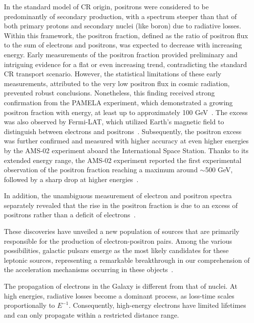 In the standard model of CR origin, positrons were considered to be predominantly of secondary production, with a spectrum steeper than that of both primary protons and secondary nuclei (like boron) due to radiative losses. Within this framework, the positron fraction, defined as the ratio of positron flux to the sum of electrons and positrons, was expected to decrease with increasing energy. Early measurements of the positron fraction provided preliminary and intriguing evidence for a flat or even increasing trend, contradicting the standard CR transport scenario. However, the statistical limitations of these early measurements, attributed to the very low positron flux in cosmic radiation, prevented robust conclusions. Nonetheless, this finding received strong confirmation from the PAMELA experiment, which demonstrated a growing positron fraction with energy, at least up to approximately 100 GeV~\cite{PAMELA.2009.posfraction}. The excess was also observed by Fermi-LAT, which utilized Earth's magnetic field to distinguish between electrons and positrons~\cite{FERMI.2012.posfraction}. 
%
Subsequently, the positron excess was further confirmed and measured with higher accuracy at even higher energies by the AMS-02 experiment aboard the International Space Station. Thanks to its extended energy range, the AMS-02 experiment reported the first experimental observation of the positron fraction reaching a maximum around $\sim$500 GeV, followed by a sharp drop at higher energies~\cite{AMS02.2013.posfraction}.

In addition, the unambiguous measurement of electron and positron spectra separately revealed that the rise in the positron fraction is due to an excess of positrons rather than a deficit of electrons~\cite{AMS02.2019.electrons}.

These discoveries have unveiled a new population of sources that are primarily responsible for the production of electron-positron pairs. Among the various possibilities, galactic pulsars emerge as the most likely candidates for these leptonic sources, representing a remarkable breakthrough in our comprehension of the acceleration mechanisms occurring in these objects~\cite{Harding1987icrc,Aharonian1995aa,Grasso2009aph,Hooper2009jcap,Delahaye2010aa,Manconi2020prd,Amato2020arxiv}.

The propagation of electrons in the Galaxy is different from that of nuclei. At high energies, radiative losses become a dominant process, as loss-time scales proportionally to $E^{-1}$. Consequently, high-energy electrons have limited lifetimes and can only propagate within a restricted distance range.


